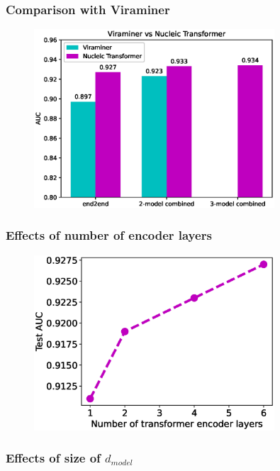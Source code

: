 \documentclass{article}
\begin{document}
\subsubsection{Comparison with Viraminer}
\begin{figure}[H]
\center
\includegraphics[width=0.8\textwidth]{viral_results.eps}
%
\caption{}
\label{fig:vs viraminer}
\end{figure}


\subsubsection{Effects of number of encoder layers}

\begin{figure}[H]
\center
\includegraphics[width=0.8\textwidth]{vira_layers.eps}
%
\caption{}
\label{fig:vira nlayer test}
\end{figure}


\subsubsection{Effects of size of $d_{model}$}
\end{document}

